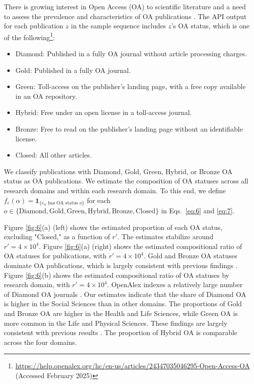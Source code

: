There is growing interest in Open Access (OA) to scientific literature and a need to assess the prevalence and characteristics of OA publications \cite{piwowar2018}.  
The API output for each publication $z$ in the sample sequence includes $z$'s OA status, which is one of the following\footnote{\url{https://help.openalex.org/hc/en-us/articles/24347035046295-Open-Access-OA} (Accessed February 2025)}:  
\begin{itemize}  
\item Diamond: Published in a fully OA journal without article processing charges.  
\item Gold: Published in a fully OA journal.  
\item Green: Toll-access on the publisher’s landing page, with a free copy available in an OA repository.  
\item Hybrid: Free under an open license in a toll-access journal.  
\item Bronze: Free to read on the publisher’s landing page without an identifiable license.  
\item Closed: All other articles.  
\end{itemize}  
We classify publications with Diamond, Gold, Green, Hybrid, or Bronze OA status as OA publications.  
We estimate the composition of OA statuses across all research domains and within each research domain.  
To this end, we define $f_{e}(\alpha) = \bm{1}_{\{e_{\alpha}\text{ has OA status } o\}}$ for each $o \in \{\text{Diamond}, \text{Gold}, \text{Green}, \text{Hybrid}, \text{Bronze}, \text{Closed}\}$ in Eqs.~\eqref{eq:6} and \eqref{eq:7}.

Figure \ref{fig:6}(a) (left) shows the estimated proportion of each OA status, excluding "Closed," as a function of $r'$.  
The estimates stabilize around $r' = 4 \times 10^4$.  
Figure \ref{fig:6}(a) (right) shows the estimated compositional ratio of OA statuses for publications, with $r' = 4 \times 10^4$.  
Gold and Bronze OA statuses dominate OA publications, which is largely consistent with previous findings \cite{piwowar2018}.  
Figure \ref{fig:6}(b) shows the estimated compositional ratio of OA statuses by research domain, with $r' = 4 \times 10^4$.  
OpenAlex indexes a relatively large number of Diamond OA journals \cite{simard2024}.  
Our estimates indicate that the share of Diamond OA is higher in the Social Sciences than in other domains.  
The proportions of Gold and Bronze OA are higher in the Health and Life Sciences, while Green OA is more common in the Life and Physical Sciences.  
These findings are largely consistent with previous results \cite{piwowar2018}.  
The proportion of Hybrid OA is comparable across the four domains.

